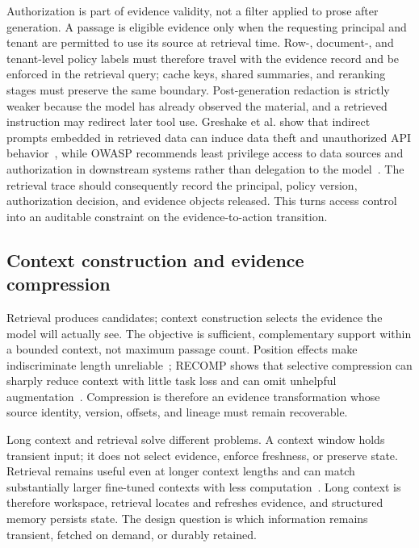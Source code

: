 Authorization is part of evidence validity, not a filter applied to prose after generation. A passage is eligible evidence only when the requesting principal and tenant are permitted to use its source at retrieval time. Row-, document-, and tenant-level policy labels must therefore travel with the evidence record and be enforced in the retrieval query; cache keys, shared summaries, and reranking stages must preserve the same boundary. Post-generation redaction is strictly weaker because the model has already observed the material, and a retrieved instruction may redirect later tool use. Greshake et al. show that indirect prompts embedded in retrieved data can induce data theft and unauthorized API behavior~\cite{greshake2023promptinjection}, while OWASP recommends least privilege access to data sources and authorization in downstream systems rather than delegation to the model~\cite{owasp2025llmtop10}. The retrieval trace should consequently record the principal, policy version, authorization decision, and evidence objects released. This turns access control into an auditable constraint on the evidence-to-action transition.

\subsection{Context construction and evidence compression}

Retrieval produces candidates; context construction selects the evidence the model will actually see. The objective is sufficient, complementary support within a bounded context, not maximum passage count. Position effects make indiscriminate length unreliable~\cite{liu2024lostinthemiddle}; RECOMP shows that selective compression can sharply reduce context with little task loss and can omit unhelpful augmentation~\cite{xu2024recomp}. Compression is therefore an evidence transformation whose source identity, version, offsets, and lineage must remain recoverable.

Long context and retrieval solve different problems. A context window holds transient input; it does not select evidence, enforce freshness, or preserve state. Retrieval remains useful even at longer context lengths and can match substantially larger fine-tuned contexts with less computation~\cite{xu2024retrievalmeets}. Long context is therefore workspace, retrieval locates and refreshes evidence, and structured memory persists state. The design question is which information remains transient, fetched on demand, or durably retained.

